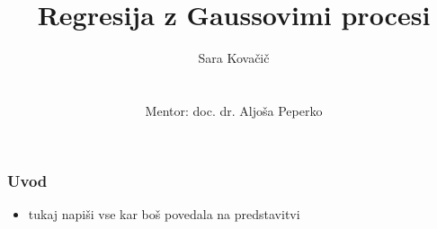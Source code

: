 \documentclass{beamer}
\title[] %
{Regresija z Gaussovimi procesi}
\author[S. Kovačič] %
{Sara Kovačič \\
\quad \\
\quad \\
Mentor: doc. dr. Aljoša Peperko 
}
\date[30. november 2018] %
\begin{document}
\begin{frame}
  \titlepage
\end{frame}








\begin{frame}\frametitle{Uvod}
\begin{itemize}

\item tukaj napiši vse kar boš povedala na predstavitvi 

\end{itemize}
\end{frame}

\end{document}
